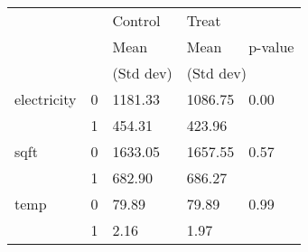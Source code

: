 \begin{tabular}{lllll}
\toprule
     &   &   Control & \multicolumn{2}{l}{Treat} \\
     &   &      Mean &      Mean & p-value \\
     &   & (Std dev) & \multicolumn{2}{l}{(Std dev)} \\
\midrule
electricity & 0 &   1181.33 &   1086.75 &    0.00 \\
     & 1 &    454.31 &    423.96 &         \\
sqft & 0 &   1633.05 &   1657.55 &    0.57 \\
     & 1 &    682.90 &    686.27 &         \\
temp & 0 &     79.89 &     79.89 &    0.99 \\
     & 1 &      2.16 &      1.97 &         \\
\bottomrule
\end{tabular}
